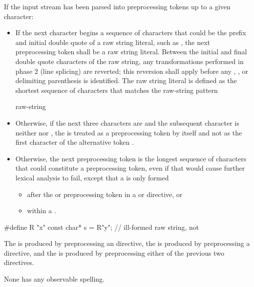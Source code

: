 \pnum
If the input stream has been parsed into preprocessing tokens up to a
given character:
\begin{itemize}
\item
{}%
If the next character begins a sequence of characters that could be the prefix
and initial double quote of a raw string literal, such as , the next preprocessing
token shall be a raw string literal. Between the initial and final
double quote characters of the raw string, any transformations performed in phase
2 (line splicing) are reverted; this reversion
shall apply before any , , or delimiting
parenthesis is identified. The raw string literal is defined as the shortest sequence
of characters that matches the raw-string pattern
\begin{ncbnf}
  raw-string
\end{ncbnf}

\item Otherwise, if the next three characters are \tcode{<::} and the subsequent character
is neither \tcode{:} nor \tcode{>}, the \tcode{<} is treated as a preprocessing token by
itself and not as the first character of the alternative token \tcode{<:}.

\item Otherwise,
the next preprocessing token is the longest sequence of
characters that could constitute a preprocessing token, even if that
would cause further lexical analysis to fail,
except that a  is only formed
\begin{itemize}
\item
after the  or  preprocessing token in a
 or
 directive, or

\item
within a .

\end{itemize}
\end{itemize}

\begin{example}
\begin{codeblock}
#define R "x"
const char* s = R"y";           // ill-formed raw string, not 
\end{codeblock}
\end{example}

\pnum
The  is produced
by preprocessing an  directive,
the  is produced
by preprocessing a  directive, and
the  is produced
by preprocessing either of the previous two directives.
\begin{note}
None has any observable spelling.
\end{note}

